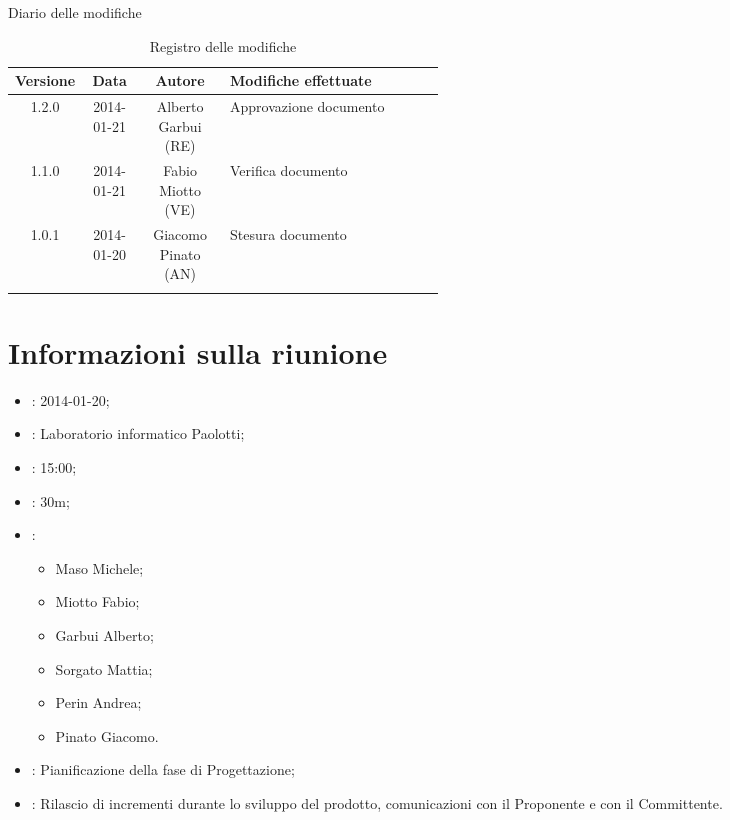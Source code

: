 
\newpage
Diario delle modifiche
\begin{center}
\begin{longtable}{|c|c|c|p{0.5\linewidth}|}
\toprule
\textbf{Versione} & \textbf{Data} & \textbf{Autore} & \textbf{Modifiche effettuate}\\

\midrule
1.2.0 & 2014-01-21 & Alberto Garbui (RE)  & Approvazione documento\\
\midrule
1.1.0 & 2014-01-21 & Fabio Miotto (VE) & Verifica documento\\
\midrule
1.0.1 & 2014-01-20 & Giacomo Pinato (AN) & Stesura documento\\

\bottomrule
\caption{Registro delle modifiche}
\label{tab:changelog}
\end{longtable}
\end{center}

\newpage
\tableofcontents


\newpage
\section{Informazioni sulla riunione}%
\label{1.0}
\begin{itemize}
\item {}: 2014-01-20;
\item {}: Laboratorio informatico Paolotti;
\item {}: 15:00;
\item {}: 30m;
\item {}: \NomeGruppo{}
\begin{itemize}
\item Maso Michele;
\item Miotto Fabio;
\item Garbui Alberto;
\item Sorgato Mattia;
\item Perin Andrea;
\item Pinato Giacomo.
\end{itemize}
\item {}: Pianificazione della fase di Progettazione;
\item {}: Rilascio di incrementi durante lo sviluppo del prodotto, comunicazioni con il Proponente e con il Committente.
\end{itemize}

